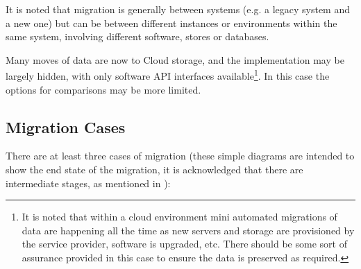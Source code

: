 It is noted that migration is generally between systems
(e.g. a legacy system and a new one) but can be between different instances or environments within the same system,
involving different software, stores or \glspl{database}.

Many moves of data are now to Cloud storage, and the implementation may be largely hidden,
with only software API interfaces available\footnote{It is noted that within a cloud environment mini automated migrations of data are happening all the time as new servers and storage are provisioned by the service provider, software is upgraded, etc. There should be some sort of assurance provided in this case to ensure the data is preserved as required.}.
In this case the options for comparisons may be more limited.
%
\subsection{Migration Cases}
%
There are at least three cases of migration (these simple diagrams are intended to show the end state of the migration, it is acknowledged that there are intermediate stages, as mentioned in ):
